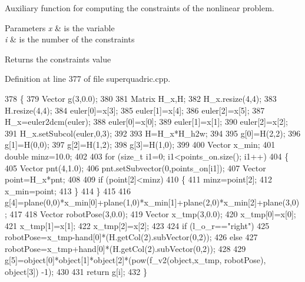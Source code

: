 Auxiliary function for computing the constraints of the nonlinear problem. 


\begin{DoxyParams}{Parameters}
{\em x} & is the variable \\
\hline
{\em i} & is the number of the constraints \\
\hline
\end{DoxyParams}
\begin{DoxyReturn}{Returns}
the constraints value 
\end{DoxyReturn}


Definition at line 377 of file superquadric.\+cpp.


\begin{DoxyCode}
378  \{
379      Vector g(3,0.0);
380 
381      Matrix H\_x,H;
382      H\_x.resize(4,4);
383      H.resize(4,4);
384      euler[0]=x[3];
385      euler[1]=x[4];
386      euler[2]=x[5];
387      H\_x=euler2dcm(euler);
388      euler[0]=x[0];
389      euler[1]=x[1];
390      euler[2]=x[2];
391      H\_x.setSubcol(euler,0,3);
392 
393      H=H\_x*H\_h2w;
394 
395      g[0]=H(2,2);
396      g[1]=H(0,0);
397      g[2]=H(1,2);
398      g[3]=H(1,0);
399 
400      Vector x\_min;
401      \textcolor{keywordtype}{double} minz=10.0;
402 
403      \textcolor{keywordflow}{for} (\textcolor{keywordtype}{size\_t} i1=0; i1<points\_on.size(); i1++)
404      \{
405          Vector pnt(4,1.0);
406          pnt.setSubvector(0,points\_on[i1]);
407          Vector point=H\_x*pnt;
408 
409          \textcolor{keywordflow}{if} (point[2]<minz)
410          \{
411              minz=point[2];
412              x\_min=point;
413          \}
414      \}
415 
416      g[4]=plane(0,0)*x\_min[0]+plane(1,0)*x\_min[1]+plane(2,0)*x\_min[2]+plane(3,0);
417 
418      Vector robotPose(3,0.0);
419      Vector x\_tmp(3,0.0);
420      x\_tmp[0]=x[0];
421      x\_tmp[1]=x[1];
422      x\_tmp[2]=x[2];
423 
424      \textcolor{keywordflow}{if} (l_o_r==\textcolor{stringliteral}{"right"})
425         robotPose=x\_tmp-hand[0]*(H.getCol(2).subVector(0,2));
426      \textcolor{keywordflow}{else}
427          robotPose=x\_tmp+hand[0]*(H.getCol(2).subVector(0,2));
428 
429      g[5]=\textcolor{keywordtype}{object}[0]*\textcolor{keywordtype}{object}[1]*\textcolor{keywordtype}{object}[2]*(pow(f_v2(\textcolor{keywordtype}{object},x\_tmp, robotPose), \textcolor{keywordtype}{object}[3]) -1);
430 
431      \textcolor{keywordflow}{return} g[i];
432  \}
\end{DoxyCode}
